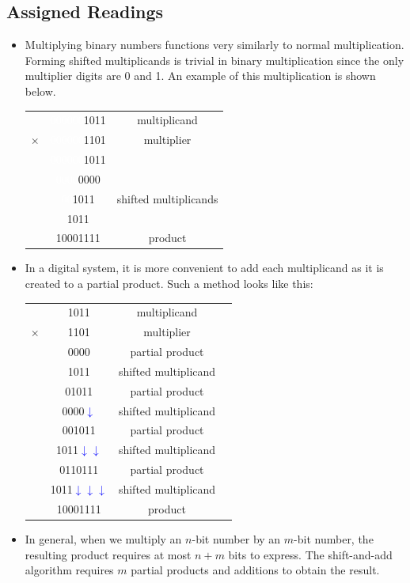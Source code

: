 \documentclass[10pt,a4paper]{article}
\begin{document}
\subsection{Assigned Readings}
\begin{itemize}
\item Multiplying binary numbers functions very similarly to normal multiplication. Forming shifted multiplicands is trivial in binary multiplication since the only multiplier digits are 0 and 1. An example of this multiplication is shown below.\\
\begin{tabular}{ccc}
  & \textcolor{white}{000000}1011 & multiplicand\\
$\times$ & \textcolor{white}{000000}1101 & multiplier\\
\cmidrule{1-2}
  & \textcolor{white}{000000}1011 & \\
  & \textcolor{white}{0000}0000 & \\
  & \textcolor{white}{00}1011 & shifted multiplicands\\
  & 1011 & \\
\cmidrule{1-2}
 & 10001111 & product 
\end{tabular}
\item In a digital system, it is more convenient to add each multiplicand as it is created to a partial product. Such a method looks like this:\\
\begin{tabular}{cccc}
  & 1011 & multiplicand\\
$\times$ & 1101 & multiplier\\
\cmidrule{1-2}
  & 0000 & partial product\\
  & 1011 & shifted multiplicand\\
\cmidrule{1-2}
  & 01011 & partial product\\
  & 0000\textcolor{blue}{$\downarrow$} & shifted multiplicand\\
\cmidrule{1-2}
  & 001011 & partial product\\
  & 1011\textcolor{blue}{$\downarrow\downarrow$} & shifted multiplicand\\
\cmidrule{1-2}
  & 0110111 & partial product\\
  & 1011\textcolor{blue}{$\downarrow\downarrow\downarrow$} & shifted multiplicand\\
\cmidrule{1-2}
  & 10001111 & product
\end{tabular}
\item In general, when we multiply an $n$-bit number by an $m$-bit number, the resulting product requires at most $n+m$ bits to express. The shift-and-add algorithm requires $m$ partial products and additions to obtain the result.

\end{itemize}
\end{document}
